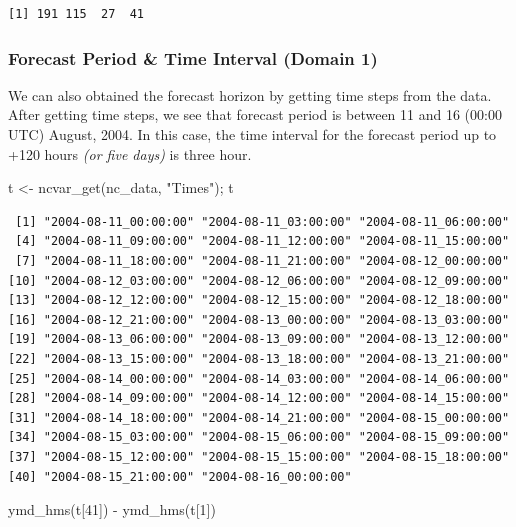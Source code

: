 \documentclass[
  letterpaper,
  DIV=11,
  numbers=noendperiod,
  abstract]{scrartcl}
\newenvironment{Shaded}{\begin{snugshade}}{\end{snugshade}}
\newcommand{\DecValTok}[1]{\textcolor[rgb]{0.68,0.00,0.00}{#1}}
\newcommand{\FunctionTok}[1]{\textcolor[rgb]{0.28,0.35,0.67}{#1}}
\newcommand{\NormalTok}[1]{\textcolor[rgb]{0.00,0.23,0.31}{#1}}
\newcommand{\OtherTok}[1]{\textcolor[rgb]{0.00,0.23,0.31}{#1}}
\newcommand{\SpecialCharTok}[1]{\textcolor[rgb]{0.37,0.37,0.37}{#1}}
\newcommand{\StringTok}[1]{\textcolor[rgb]{0.13,0.47,0.30}{#1}}
\begin{document}
\begin{verbatim}
[1] 191 115  27  41
\end{verbatim}

\hypertarget{forecast-period-time-interval-domain-1}{%
\subsubsection{Forecast Period \& Time Interval (Domain
1)}\label{forecast-period-time-interval-domain-1}}

We can also obtained the forecast horizon by getting time steps from the
data. After getting time steps, we see that forecast period is between
11 and 16 (00:00 UTC) August, 2004. In this case, the time interval for
the forecast period up to +120 hours \emph{(or five days)} is three
hour.

\begin{Shaded}
\begin{Highlighting}[]
\NormalTok{t }\OtherTok{\textless{}{-}} \FunctionTok{ncvar\_get}\NormalTok{(nc\_data, }\StringTok{"Times"}\NormalTok{); t}
\end{Highlighting}
\end{Shaded}

\begin{verbatim}
 [1] "2004-08-11_00:00:00" "2004-08-11_03:00:00" "2004-08-11_06:00:00"
 [4] "2004-08-11_09:00:00" "2004-08-11_12:00:00" "2004-08-11_15:00:00"
 [7] "2004-08-11_18:00:00" "2004-08-11_21:00:00" "2004-08-12_00:00:00"
[10] "2004-08-12_03:00:00" "2004-08-12_06:00:00" "2004-08-12_09:00:00"
[13] "2004-08-12_12:00:00" "2004-08-12_15:00:00" "2004-08-12_18:00:00"
[16] "2004-08-12_21:00:00" "2004-08-13_00:00:00" "2004-08-13_03:00:00"
[19] "2004-08-13_06:00:00" "2004-08-13_09:00:00" "2004-08-13_12:00:00"
[22] "2004-08-13_15:00:00" "2004-08-13_18:00:00" "2004-08-13_21:00:00"
[25] "2004-08-14_00:00:00" "2004-08-14_03:00:00" "2004-08-14_06:00:00"
[28] "2004-08-14_09:00:00" "2004-08-14_12:00:00" "2004-08-14_15:00:00"
[31] "2004-08-14_18:00:00" "2004-08-14_21:00:00" "2004-08-15_00:00:00"
[34] "2004-08-15_03:00:00" "2004-08-15_06:00:00" "2004-08-15_09:00:00"
[37] "2004-08-15_12:00:00" "2004-08-15_15:00:00" "2004-08-15_18:00:00"
[40] "2004-08-15_21:00:00" "2004-08-16_00:00:00"
\end{verbatim}

\begin{Shaded}
\begin{Highlighting}[]
\FunctionTok{ymd\_hms}\NormalTok{(t[}\DecValTok{41}\NormalTok{]) }\SpecialCharTok{{-}} \FunctionTok{ymd\_hms}\NormalTok{(t[}\DecValTok{1}\NormalTok{])}
\end{Highlighting}
\end{Shaded}
\end{document}
